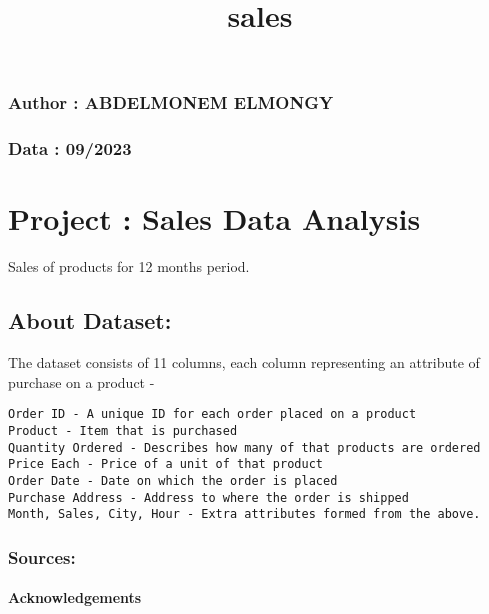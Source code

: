 \documentclass[11pt]{article}
\title{sales}
\begin{document}
    
    \maketitle
    
    

    
    \hypertarget{author-abdelmonem-elmongy}{%
\subsubsection{Author : ABDELMONEM
ELMONGY}\label{author-abdelmonem-elmongy}}

\hypertarget{data-092023}{%
\subsubsection{Data : 09/2023}\label{data-092023}}

    \hypertarget{project-sales-data-analysis}{%
\section{Project : Sales Data
Analysis}\label{project-sales-data-analysis}}

Sales of products for 12 months period.

    \hypertarget{about-dataset}{%
\subsection{About Dataset:}\label{about-dataset}}

The dataset consists of 11 columns, each column representing an
attribute of purchase on a product -

\begin{verbatim}
Order ID - A unique ID for each order placed on a product
Product - Item that is purchased
Quantity Ordered - Describes how many of that products are ordered
Price Each - Price of a unit of that product
Order Date - Date on which the order is placed
Purchase Address - Address to where the order is shipped
Month, Sales, City, Hour - Extra attributes formed from the above.
\end{verbatim}

\hypertarget{sources}{%
\subsubsection{Sources:}\label{sources}}

\hypertarget{acknowledgements}{%
\paragraph{Acknowledgements}\label{acknowledgements}}
\end{document}

